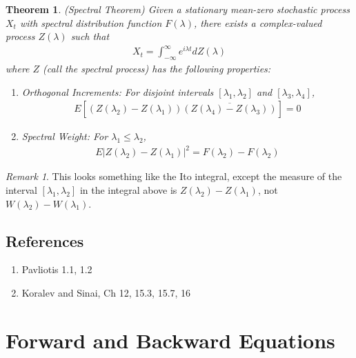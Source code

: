 \documentclass[12pt]{article}
\theoremstyle{plain}
\newtheorem{thm}{Theorem}[section]
\theoremstyle{definition}
\theoremstyle{remark}
\newtheorem*{rmk}{Remark}
\begin{document}
\begin{thm}\emph{(Spectral Theorem)}
Given a stationary mean-zero stochastic process $X_t$ with spectral
distribution function $F(\lambda)$, there exists a complex-valued
process $Z(\lambda)$ such that
\begin{align*}
  X_t = \int^\infty_{-\infty} e^{i\lambda t} dZ(\lambda)
\end{align*}
where $Z$ (call the \emph{spectral process}) has the following
properties:
\begin{enumerate}
  \item Orthogonal Increments: For disjoint intervals
    $[\lambda_1,\lambda_2]$ and $[\lambda_3,\lambda_4]$,
    \begin{align*}
      E\left[
        (Z(\lambda_2)-Z(\lambda_1))
        \overline{(Z(\lambda_4)-Z(\lambda_3))}
      \right] = 0
    \end{align*}
  \item Spectral Weight: For $\lambda_1\leq \lambda_2$,
    \begin{align*}
      E\left\lvert Z(\lambda_2)-Z(\lambda_1)\right\rvert^2
      = F(\lambda_2)-F(\lambda_2)
    \end{align*}
\end{enumerate}
\end{thm}
\begin{rmk}
This looks something like the Ito integral, except the measure of the
interval $[\lambda_1,\lambda_2]$ in the integral above is
$Z(\lambda_2)-Z(\lambda_1)$, not $W(\lambda_2)-W(\lambda_1)$.
\end{rmk}

\subsection{References}
\begin{enumerate}
  \item Pavliotis 1.1, 1.2
  \item Koralev and Sinai, Ch 12, 15.3, 15.7, 16
\end{enumerate}

\section{Forward and Backward Equations}
\end{document}

